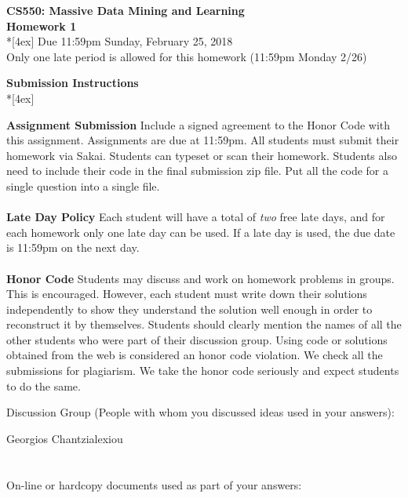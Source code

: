 \documentclass[11pt]{article}
\begin{document}
\thispagestyle{empty}
\parindent 0pt
\vfill
\large

\begin{center}
\LARGE{\bf \textsf{CS550: Massive Data Mining and Learning}}\\ {\bf \textsf{Homework 1}} 
\\*[4ex]
Due 11:59pm Sunday, February 25, 2018\\
Only one late period is allowed for this homework (11:59pm Monday 2/26)
\end{center}

\pagebreak[4]
\begin{center}
\LARGE{\bf \textsf{Submission Instructions}} \\*[4ex]
\end{center}

\textbf{Assignment Submission } Include a signed agreement to the Honor Code with this assignment. Assignments are due at 11:59pm. All students must submit their homework via Sakai. Students can typeset or scan their homework. Students also need to include their code in the final submission zip file. Put all the code for a single question into a single file. 
\\
\\
\textbf{Late Day Policy } Each student will have a total of {\em two} free late days, and for each homework only one late day can be used. If a late day is used, the due date is 11:59pm on the next day.
\\
\\
\textbf{Honor Code } Students may discuss and work on homework problems in groups. This is encouraged. However, each student must write down their solutions independently to show they understand the solution well enough in order to reconstruct it by themselves.  Students should clearly mention the names of all the other students who were part of their discussion group. Using code or solutions obtained from the web is considered an honor code violation. We check all the submissions for plagiarism. We take the honor code seriously and expect students to do the same. 

\vfill
\vfill

Discussion Group (People with whom you discussed ideas used in your answers):

 Georgios Chantzialexiou \\\\\\
On-line or hardcopy documents used as part of your answers: \\\\\\
\vfill
\end{document}
